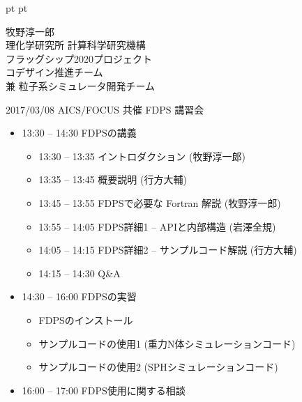 \documentclass[12pt,dvipdfmx]{article}
\begin{document}
\LARGE

 pt
 pt

\date{}





{\large

\begin{center}
牧野淳一郎\\
理化学研究所 計算科学研究機構\\
フラッグシップ2020プロジェクト\\
コデザイン推進チーム\\
兼 粒子系シミュレータ開発チーム

\leavevmode


\end{center}

}

\vfill

\hfill 2017/03/08 AICS/FOCUS 共催 FDPS 講習会
 



\begin{itemize}

\item 13:30 -- 14:30 FDPSの講義
  \begin{itemize}
  \item 13:30 -- 13:35 イントロダクション (牧野淳一郎)
  \item 13:35 -- 13:45 概要説明 (行方大輔)
  \item 13:45 -- 13:55 FDPSで必要な Fortran 解説 (牧野淳一郎)
  \item 13:55 -- 14:05 FDPS詳細1 -- APIと内部構造 (岩澤全規)
  \item 14:05 -- 14:15 FDPS詳細2 -- サンプルコード解説 (行方大輔)
  \item 14:15 -- 14:30 Q\&A
  \end{itemize}

\item 14:30 -- 16:00 FDPSの実習
  \begin{itemize}
  \item FDPSのインストール
  \item サンプルコードの使用1 (重力N体シミュレーションコード)
  \item サンプルコードの使用2 (SPHシミュレーションコード)
  \end{itemize}

\item 16:00 -- 17:00 FDPS使用に関する相談

\end{itemize}
\end{document}
